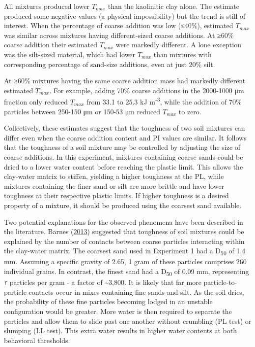 \documentclass[
  letterpaper,
]{article}
\begin{document}
All mixtures produced lower \(T_{max}\) than the kaolinitic clay alone. The estimate produced some negative values (a physical impossibility) but the trend is still of interest.
When the percentage of coarse addition was low (≤40\%), estimated \(T_{max}\) was similar across mixtures having different-sized coarse additions.
At ≥60\% coarse addition their estimated \(T_{max}\) were markedly different.
A lone exception was the silt-sized material, which had lower \(T_{max}\) than mixtures with corresponding percentage of sand-size additions, even at just 20\% silt.

At ≥60\% mixtures having the same coarse addition mass had markedly different estimated \(T_{max}\).
For example, adding 70\% coarse additions in the 2000-1000 μm fraction only reduced \(T_{max}\) from 33.1 to 25.3 kJ m\textsuperscript{-3}, while the addition of 70\% particles between 250-150 μm or 150-53 μm reduced \(T_{max}\) to zero.

Collectively, these estimates suggest that the toughness of two soil mixtures can differ even when the coarse addition content and PI values are similar.
It follows that the toughness of a soil mixture may be controlled by adjusting the size of coarse additions.
In this experiment, mixtures containing coarse sands could be dried to a lower water content before reaching the plastic limit.
This allows the clay-water matrix to stiffen, yielding a higher toughness at the PL, while mixtures containing the finer sand or silt are more brittle and have lower toughness at their respective plastic limits.
If higher toughness is a desired property of a mixture, it should be produced using the coarsest sand available.

Two potential explanations for the observed phenomena have been described in the literature.
Barnes (\protect\hyperlink{ref-Barnes2013}{2013}) suggested that toughness of soil mixtures could be explained by the number of contacts between coarse particles interacting within the clay-water matrix.
The coarsest sand used in Experiment 1 had a D\textsubscript{50} of 1.4 mm. Assuming a
specific gravity of 2.65, 1 gram of these particles comprises 260 individual grains.
In contrast, the finest sand had a D\textsubscript{50} of 0.09 mm, representing \texttt{r} particles per gram - a factor of \textasciitilde3,800.
It is likely that far more particle-to-particle contacts occur in mixes containing fine sands and silt.
As the soil dries, the probability of these fine particles becoming lodged in an unstable configuration would be greater.
More water is then required to separate the particles and allow them to slide past one another without crumbling (PL test) or slumping (LL test).
This extra water results in higher water contents at both behavioral thresholds.
\end{document}
